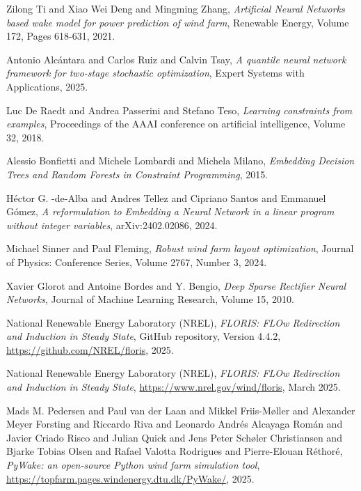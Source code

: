 \documentclass[preprint,12pt]{elsarticle}
\begin{document}
\begin{thebibliography}{00}
Zilong Ti and Xiao Wei Deng and Mingming Zhang,
\textit{Artificial Neural Networks based wake model for power prediction of wind farm},
Renewable Energy,
Volume 172,
Pages 618-631,
2021.

Antonio Alcántara and Carlos Ruiz and Calvin Tsay,
\textit{A quantile neural network framework for two-stage stochastic optimization},
Expert Systems with Applications,
2025.

Luc De Raedt and Andrea Passerini and Stefano Teso,
\textit{Learning constraints from examples},
Proceedings of the AAAI conference on artificial intelligence,
Volume 32,
2018.

Alessio Bonfietti and Michele Lombardi and Michela Milano,
\textit{Embedding Decision Trees and Random Forests in Constraint Programming},
2015.

Héctor G. -de-Alba and Andres Tellez and Cipriano Santos and Emmanuel Gómez,
\textit{A reformulation to Embedding a Neural Network in a linear program without integer variables},
arXiv:2402.02086,
2024.

Michael Sinner and Paul Fleming,
\textit{Robust wind farm layout optimization},
Journal of Physics: Conference Series,
Volume 2767,
Number 3,
2024.

Xavier Glorot and Antoine Bordes and Y. Bengio,
\textit{Deep Sparse Rectifier Neural Networks},
Journal of Machine Learning Research,
Volume 15,
2010.

National Renewable Energy Laboratory (NREL),
\textit{FLORIS: FLOw Redirection and Induction in Steady State},
GitHub repository,
Version 4.4.2,
\url{https://github.com/NREL/floris},
2025.

National Renewable Energy Laboratory (NREL),
\textit{FLORIS: FLOw Redirection and Induction in Steady State},
\url{https://www.nrel.gov/wind/floris},
March 2025.

Mads M. Pedersen and Paul van der Laan and Mikkel Friis-Møller and Alexander Meyer Forsting and Riccardo Riva and Leonardo Andrés Alcayaga Román and Javier Criado Risco and Julian Quick and Jens Peter Schøler Christiansen and Bjarke Tobias Olsen and Rafael Valotta Rodrigues and Pierre-Elouan Réthoré,
\textit{PyWake: an open-source Python wind farm simulation tool},
\url{https://topfarm.pages.windenergy.dtu.dk/PyWake/},
2025.


\end{thebibliography}
\end{document}
